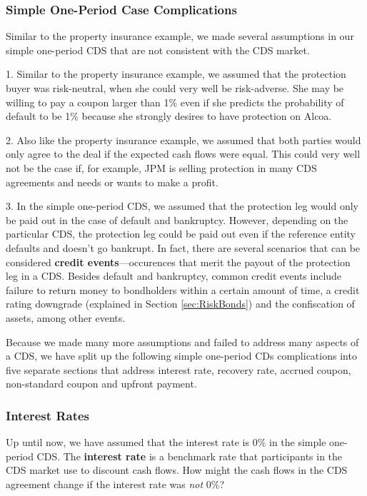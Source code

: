 \documentclass[article]{jss}
\begin{document}
\subsubsection{Simple One-Period Case Complications}
\label{OnePeriodComp}

Similar to the property insurance example, we made several assumptions in our simple one-period CDS that are not consistent with the CDS market. 

1. Similar to the property insurance example, we assumed that the protection buyer was risk-neutral, when she could very well be risk-adverse. She may be willing to pay a coupon larger than 1\% even if she predicts the probability of default to be 1\% because she strongly desires to have protection on Alcoa.

2. Also like the property insurance example, we assumed that both parties would only agree to the deal if the expected cash flows were equal. This could very well not be the case if, for example, JPM is selling protection in many CDS agreements and needs or wants to make a profit.

3. In the simple one-period CDS, we assumed that the protection leg would only be paid out in the case of default and bankruptcy. However, depending on the particular CDS, the protection leg could be paid out even if the reference entity defaults and doesn't go bankrupt. In fact, there are several scenarios that can be considered \textbf{credit events}---occurences that merit the payout of the protection leg in a CDS. Besides default and bankruptcy, common credit events include failure to return money to bondholders within a certain amount of time, a credit rating downgrade (explained in Section \ref{sec:RiskBonds}) and the confiscation of assets, among other events.

Because we made many more assumptions and failed to address many aspects of a CDS, we have split up the following simple one-period CDs complications into five separate sections that address interest rate, recovery rate, accrued coupon, non-standard coupon and upfront payment. 

\subsubsection{Interest Rates}
\label{sec:InterestRate}

Up until now, we have assumed that the interest rate is 0\% in the simple one-period CDS. The \textbf{interest rate} is a benchmark rate that participants in the CDS market use to discount cash flows. How might the cash flows in the CDS agreement change if the interest rate was \emph{not} 0\%?
\end{document}
